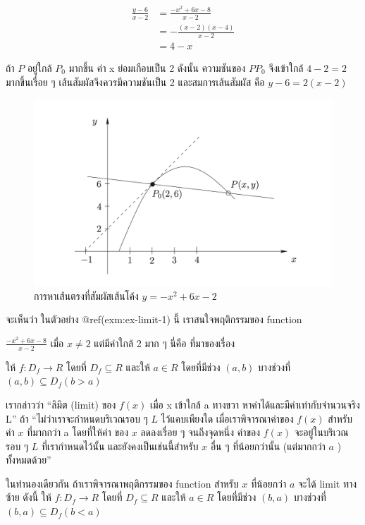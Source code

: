 \documentclass[
]{book}
\begin{document}
\begin{equation}
  \begin{aligned}
    \frac{y-6}{x-2} &= \frac{-x^{2}+6x-8}{x-2} \\
                    &=-\frac{\left( x-2\right) \left( x-4\right) }{x-2} \\
                    &=4-x
  \end{aligned}
\end{equation}

ถ้า \(P\) อยู่ใกล้ \(P_{0}\) มากขึ้น ค่า x ย่อมเกือบเป็น 2 ดังนั้น ความชันของ
\(PP_{0}\) จึงเข้าใกล้ \(4-2 = 2\) มากขึ้นเรื่อย ๆ เส้นสัมผัสจึงควรมีความชันเป็น 2
และสมการเส้นสัมผัส คือ \(y-6=2\left( x-2\right)\)

\begin{figure}

{\centering \includegraphics[width=0.5\linewidth]{images/fig-tangent-line-2} 

}

\caption{การหาเส้นตรงที่สัมผัสเส้นโค้ง \(y=-x^{2}+6x-2\)}\label{fig:fig-tangent-line-2}
\end{figure}

จะเห็นว่า ในตัวอย่าง @ref(exm:ex-limit-1) นี้ เราสนใจพฤติกรรมของ function

\(\frac{-x^{2}+6x-8}{x-2}\) เมื่อ \(x \neq 2\) แต่มีค่าใกล้ 2 มาก ๆ นี่คือ
ที่มาของเรื่อง

\label{def-limit}
ให้ \(f : D_{f}\rightarrow R\) โดยที่ \(D_{f}\subseteq R\) และให้
\(a \in R\) โดยที่มีช่วง \((a,b)\) บางช่วงที่
\(\left( a,b\right) \subseteq D_{f}\left( b>a\right)\)

เรากล่าวว่า ``ลิมิต (limit) ของ \(f(x)\) เมื่อ x เข้าใกล้ a ทางขวา
หาค่าได้และมีค่าเท่ากับจำนวนจริง L'' ถ้า ``ไม่ว่าเราจะกำหนดบริเวณรอบ ๆ \(L\)
ไว้แคบเพียงใด เมื่อเราพิจารณาค่าของ \(f(x)\) สำหรับค่า \(x\) ที่มากกว่า a โดยที่ให้ค่า
ของ \(x\) ลดลงเรื่อย ๆ จนถีงจุดหนึ่ง ค่าของ \(f(x)\) จะอยู่ในบริเวณรอบ ๆ \(L\)
ที่เรากำหนดไว้นั้น และยังคงเป็นเช่นนี้สำหรับ \(x\) อื่น ๆ ที่น้อยกว่านั้น (แต่มากกว่า \(a\) )
ทั้งหมดด้วย''

ในทำนองเดียวกัน ถ้าเราพิจารณาพฤติกรรมของ function สำหรับ \(x\) ที่น้อยกว่า \(a\)
จะได้ limit ทางซ้าย ดังนี้ ให้ \(f : D_{f}\rightarrow R\) โดยที่
\(D_{f}\subseteq R\) และให้ \(a \in R\) โดยที่มีช่วง \((b,a)\) บางช่วงที่
\(\left( b,a\right) \subseteq D_{f}\left( b<a\right)\)
\end{document}
